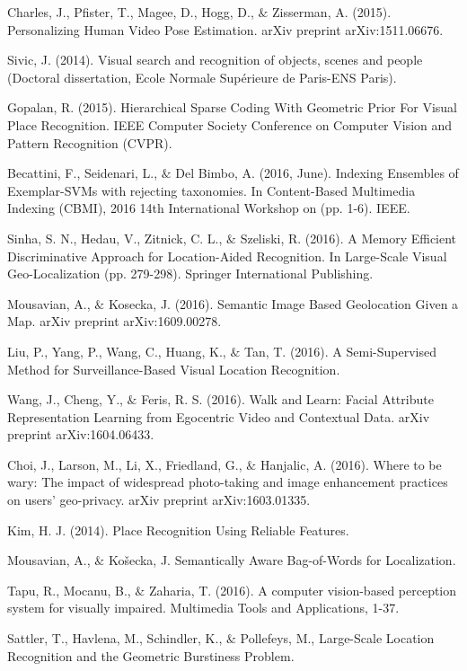 \noindent
Charles, J., Pfister, T., Magee, D., Hogg, D., $\&$ Zisserman, A. (2015). Personalizing Human Video Pose Estimation. arXiv preprint arXiv:1511.06676.


\noindent
Sivic, J. (2014). Visual search and recognition of objects, scenes and people (Doctoral dissertation, Ecole Normale Supérieure de Paris-ENS Paris).


\noindent
Gopalan, R. (2015). Hierarchical Sparse Coding With Geometric Prior For Visual Place Recognition. IEEE Computer Society Conference on Computer Vision and Pattern Recognition (CVPR).


\noindent
Becattini, F., Seidenari, L., $\&$ Del Bimbo, A. (2016, June). Indexing Ensembles of Exemplar-SVMs with rejecting taxonomies. In Content-Based Multimedia Indexing (CBMI), 2016 14th International Workshop on (pp. 1-6). IEEE.


\noindent
Sinha, S. N., Hedau, V., Zitnick, C. L., $\&$ Szeliski, R. (2016). A Memory Efficient Discriminative Approach for Location-Aided Recognition. In Large-Scale Visual Geo-Localization (pp. 279-298). Springer International Publishing.

\noindent
Mousavian, A., $\&$ Kosecka, J. (2016). Semantic Image Based Geolocation Given a Map. arXiv preprint arXiv:1609.00278.


\noindent
Liu, P., Yang, P., Wang, C., Huang, K., $\&$ Tan, T. (2016). A Semi-Supervised Method for Surveillance-Based Visual Location Recognition.


\noindent
Wang, J., Cheng, Y., $\&$ Feris, R. S. (2016). Walk and Learn: Facial Attribute Representation Learning from Egocentric Video and Contextual Data. arXiv preprint arXiv:1604.06433.


\noindent
Choi, J., Larson, M., Li, X., Friedland, G., $\&$ Hanjalic, A. (2016). Where to be wary: The impact of widespread photo-taking and image enhancement practices on users' geo-privacy. arXiv preprint arXiv:1603.01335.

\noindent
Kim, H. J. (2014). Place Recognition Using Reliable Features.

\noindent
Mousavian, A., $\&$ Košecka, J. Semantically Aware Bag-of-Words for Localization.

\noindent
Tapu, R., Mocanu, B., $\&$ Zaharia, T. (2016). A computer vision-based perception system for visually impaired. Multimedia Tools and Applications, 1-37.

\noindent
Sattler, T., Havlena, M., Schindler, K., $\&$ Pollefeys, M., Large-Scale Location Recognition and the Geometric Burstiness Problem.


